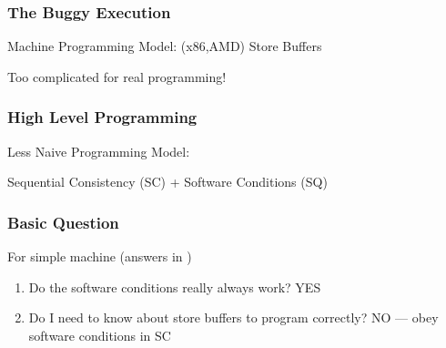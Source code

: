 \documentclass{beamer}
\begin{document}
\begin{frame}
\frametitle{The Buggy Execution}
Machine Programming Model: (x86,AMD) Store Buffers
\begin{center}\end{center}
Too complicated for real programming!
\end{frame} 





\begin{frame}
\frametitle{High Level Programming}
Less Naive Programming Model:

Sequential Consistency (SC) + Software Conditions (SQ)
\begin{center}\end{center}
\end{frame}




\begin{frame}
\frametitle{Basic Question}
For simple machine (answers in \cite{cohen_schirmer})
\begin{enumerate} 
\item Do the software conditions really always work? YES 
\item Do I need to know about store buffers to program correctly? NO --- obey software conditions in SC 
\end{enumerate}
\end{frame}
\end{document}
